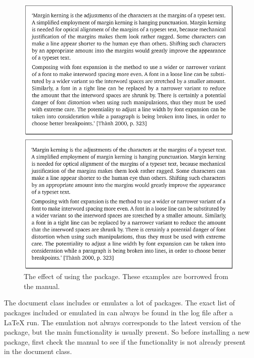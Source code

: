 \begin{figure}
  \centering
  \includegraphics[width=\columnwidth]{expfprof.png}%
  \par\bigskip
  \includegraphics[width=\columnwidth]{exptprot.png}%
  \caption[The effect of using the  package.]{The effect of
    using the  package. These examples are borrowed from the
     manual.}
  \label{fig:microtype}
\end{figure}

The document class  includes or emulates a lot of packages. The
exact list of packages included or emulated in  can always be
found in the log file after a LaTeX run. The emulation not always
corresponds to the latest version of the package, but the main
functionality is usually present. So before installing a new package, first
check the  manual to see if the functionality is not already
present in the document class.

